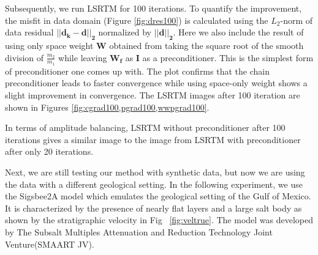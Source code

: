 
%

Subsequently, we run LSRTM for 100 iterations. To quantify the improvement, the misfit in data domain (Figure \ref{fig:dres100}) is calculated using the $L_2$-norm of data residual $\mathbf{|| d_k - d ||_{2}}$ normalized by $\mathbf{||d ||_{2}}$. Here we also include the result of using only space weight $\mathbf{W}$ obtained from taking the square root of the smooth division of $\frac{m_2}{m_1}$ while leaving $\mathbf{W_f}$ as $\mathbf{I}$ as a preconditioner. This is the simplest form of preconditioner one comes up with.
The plot confirms that the chain preconditioner leads to faster convergence while using space-only weight shows a slight improvement in convergence. The LSRTM images after 100 iteration are shown in Figures \ref{fig:cgrad100,pgrad100,wwpgrad100}. 





In terms of amplitude balancing, LSRTM without preconditioner after 100 iterations gives a similar image to the image from LSRTM with preconditioner after only 20 iterations.


Next, we are still testing our method with synthetic data, but now we are using the data with a different geological setting. In the following experiment, we use the Sigsbee2A model which emulates the geological setting of the Gulf of Mexico. It is characterized by the presence of nearly flat layers and a large salt body as shown by the stratigraphic velocity in Fig ~\ref{fig:veltrue}. The model was developed by The  Subsalt  Multiples  Attenuation and  Reduction  Technology  Joint  Venture(SMAART JV).

